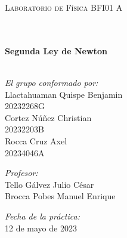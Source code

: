 \documentclass[10pt]{article}
\begin{document}
\begin{center}
\begin{minipage}{0.9\textwidth} 
\begin{center}																					%
\textsc{\LARGE  Laboratorio de Física BFI01 A}
\end{center}
\end{minipage}\\[0.3cm]
 			\vspace*{0.4cm}																		%
\HRule \\[0.5cm]																	%
{ \huge \bfseries Segunda Ley de Newton}\\[0.2cm]	%
\HRule \\[0.9cm]																	%
\begin{minipage}{0.46\textwidth}													%
\begin{flushleft} \large															%

\emph{El grupo conformado por:}\\[2mm]
Llactahuaman Quispe Benjamin\\20232268G \\[1mm]
Cortez Núñez Christian\\20232203B\\[1mm]
Rocca Cruz Axel\\20234046A\\[1mm]
 

\end{flushleft}																		%
\end{minipage}		
\begin{minipage}{0.52\textwidth}		
\vspace{-1.9cm}											%
\begin{flushright} \large															%
\emph{Profesor:}\\[2mm]																	%
Tello Gálvez Julio César\\[1mm]Brocca Pobes Manuel Enrique\\
\end{flushright}																	%
\end{minipage}	
\vspace*{1cm}
 	
\vspace{-2.4cm}	
\begin{minipage}{0.98\textwidth}
\begin{flushright}	
\large
\emph{Fecha de la práctica:}\\
\vspace{0.2cm}
12 de mayo de 2023 
\end{flushright}
\end{minipage}


\end{center}
\end{document}
